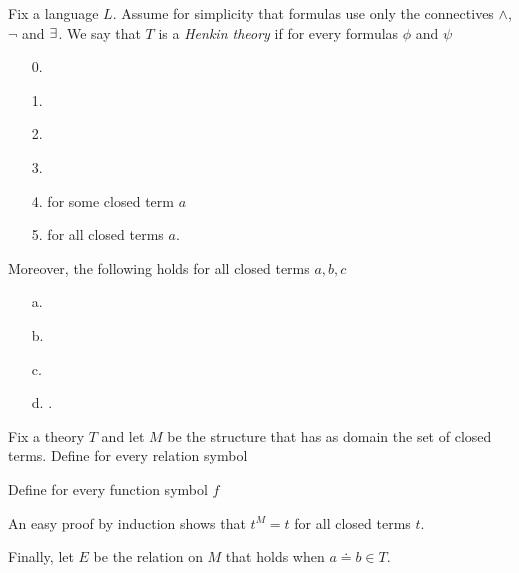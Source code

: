 \documentclass[creche.tex]{subfiles}
\begin{document}
\begin{definition}\label{def_Henkin}
Fix a language $L$. Assume for simplicity that formulas use only the connectives $\wedge$, $\neg$ and $\exists$. We say that $T$ is a \emph{Henkin theory\/} if for every formulas $\phi$ and $\psi$

\begin{itemize}
\item[0.]
\item[1.]
\item[2.]
\item[3.]
\item[4.]\quad for some closed term $a$
\item[5.]\quad for all closed terms $a$.
\end{itemize}
Moreover, the following holds for all closed terms $a, b, c$
\begin{itemize}
\item[a.] 
\item[b.] 
\item[c.] 
\item[d.] .\QED
\end{itemize}
\end{definition}

Fix a theory $T$ and let \emph{$M$} be the structure that has as domain the set of closed terms. Define for every relation symbol



Define for every function symbol $f$


An easy proof by induction shows that $t^M=t$ for all closed terms $t$. 

Finally, let \emph{$E$} be the relation on $M$ that holds when $a{\doteq}b\in T$. 
\end{document}
